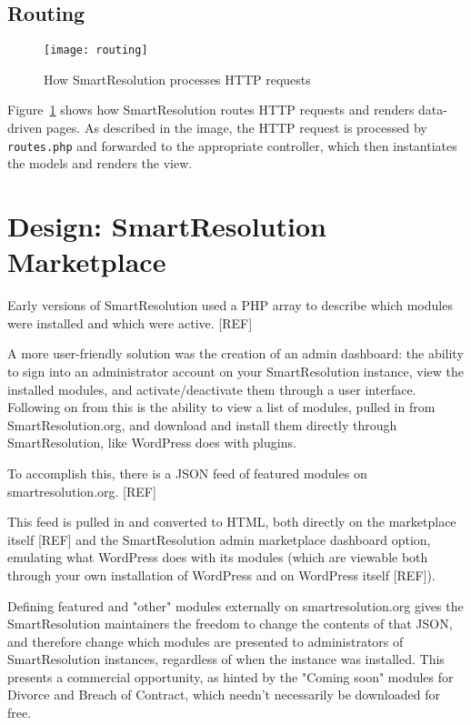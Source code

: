 \subsection{Routing}

\begin{figure}[h!]
  \centering
    \ifimages
    \texttt{[image: routing]}
    \fi
  \caption{How SmartResolution processes HTTP requests}
  \label{uml:routing}
\end{figure}

Figure~\ref{uml:routing} shows how SmartResolution routes HTTP requests and renders data-driven pages. As described in the image, the HTTP request is processed by \lstinline{routes.php} and forwarded to the appropriate controller, which then instantiates the models and renders the view.

\section{Design: SmartResolution Marketplace}

Early versions of SmartResolution used a PHP array to describe which modules were installed and which were active. [REF] %

A more user-friendly solution was the creation of an admin dashboard: the ability to sign into an administrator account on your SmartResolution instance, view the installed modules, and activate/deactivate them through a user interface. Following on from this is the ability to view a list of modules, pulled in from SmartResolution.org, and download and install them directly through SmartResolution, like WordPress does with plugins.

To accomplish this, there is a JSON feed of featured modules on smartresolution.org. [REF] %

This feed is pulled in and converted to HTML, both directly on the marketplace itself [REF] and the SmartResolution admin marketplace dashboard option, emulating what WordPress does with its modules (which are viewable both through your own installation of WordPress and on WordPress itself [REF]). %

Defining featured and "other" modules externally on smartresolution.org gives the SmartResolution maintainers the freedom to change the contents of that JSON, and therefore change which modules are presented to administrators of SmartResolution instances, regardless of when the instance was installed. This presents a commercial opportunity, as hinted by the "Coming soon" modules for Divorce and Breach of Contract, which needn't necessarily be downloaded for free.

